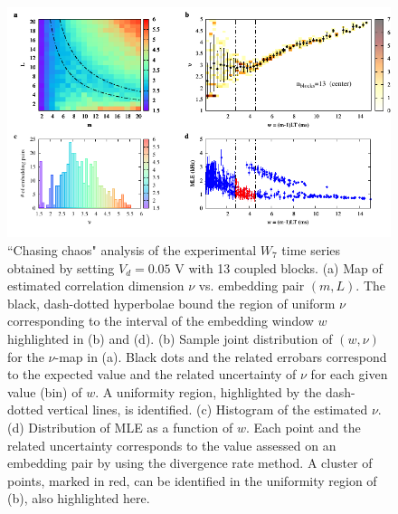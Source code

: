 \begin{figure}[H]
    \centering
    \includegraphics[width=\linewidth]{../blocks/13_blocks/middle/2e5_points/plots/chaos_low.pdf}
    \caption{``Chasing chaos" analysis of the experimental $W_7$ time series obtained by setting $V_d=0.05$ V with 13 coupled blocks.
    (a) Map of estimated correlation dimension $\nu$ vs. embedding pair $(m, L)$.
    The black, dash-dotted hyperbolae bound the region of uniform $\nu$ corresponding to the interval of the
    embedding window $w$ highlighted in (b) and (d).
    (b) Sample joint distribution of $(w,\nu)$ for the $\nu$-map in (a).
    Black dots and the related errobars correspond to the expected value and the related uncertainty of $\nu$
    for each given value (bin) of $w$. A uniformity region, highlighted by the dash-dotted vertical lines,
    is identified. (c) Histogram of the estimated $\nu$. (d) Distribution of MLE as a function of $w$. Each point and the related
    uncertainty corresponds to the value assessed on an embedding pair by using the divergence rate method.
    A cluster of points, marked in red, can be identified in the uniformity region of (b), also highlighted here.}
    \label{fig:13 blocks chaos middle}
\end{figure}


